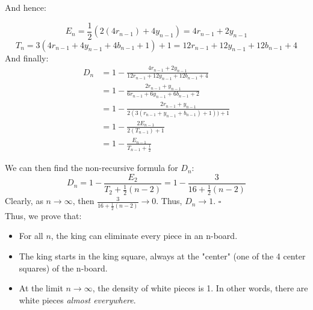 \documentclass{article}
\begin{document}
   And hence:

$$E_n = \frac{1}{2}(2(4r_{n-1}) + 4y_{n-1}) = 4r_{n-1} + 2y_{n-1}$$
$$T_n = 3(4r_{n-1} + 4y_{n-1} +4b_{n-1} + 1) + 1 = 12r_{n-1} + 12y_{n-1} +12b_{n-1} + 4$$
And finally:
\begin{align*}
D_n &= 1 - \frac{4r_{n-1} + 2y_{n-1}}{12r_{n-1} + 12y_{n-1} +12b_{n-1} + 4} \\
 &= 1 - \frac{2r_{n-1} + y_{n-1}}{6r_{n-1} + 6y_{n-1} +6b_{n-1} + 2} \\ 
 &= 1 - \frac{2r_{n-1} + y_{n-1}}{2(3(r_{n-1} + y_{n-1} +b_{n-1}) + 1)) + 1} \\ 
 &= 1 - \frac{2E_{n-1}}{2(T_{n-1}) + 1} \\
 &= 1 - \frac{E_{n-1}}{T_{n-1} + \frac{1}{2}} 
\end{align*}   

   We can then find the non-recursive formula for $D_n$:
   $$D_n = 1 - \frac{E_2}{T_2 + \frac{1}{2}(n-2)} = 1 - \frac{3}{16 + \frac{1}{2}(n-2)}$$
Clearly, as $n \to \infty$, then $\frac{3}{16 + \frac{1}{2}(n-2)} \to 0$. Thus, $D_n \to 1$. $\square$
\\
Thus, we prove that:
\begin{itemize}
\item For all $n$, the king can eliminate every piece in an n-board. 
\item The king starts in the king square, always at the "center" (one of the 4 center squares) of the n-board.
\item At the limit $n \to \infty$, the density of white pieces is 1. In other words, there are white pieces \textit{almost everywhere}.
\end{itemize}
    \newpage

   
\end{document}
